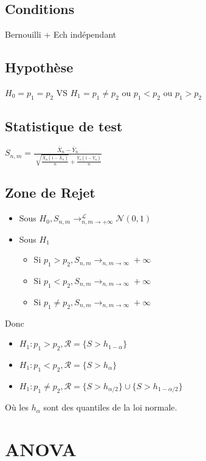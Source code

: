\documentclass[9pt]{article}
\theoremstyle{plain}%
\theoremstyle{definition}
\theoremstyle{remark}
\begin{document}
\begin{multicols}{3}
\subsection*{Conditions}
Bernouilli + Ech indépendant

\subsection*{Hypothèse}
$ H_0 = p_1 = p_2 $ VS $ H_1 = p_1 \neq p_2 $ ou $ p_1 < p_2 $ ou $ p_1 > p_2 $ 

\subsection*{Statistique de test}
$S_{n,m} = \frac{\bar{X}_n - \bar{Y}_n}{\sqrt[]{ \frac{\bar{X}_n (1 - \bar{X}_n)}{n}} + \frac{\bar{Y}_n (1 - \bar{Y}_n)}{n}}$

\subsection*{Zone de Rejet}
\begin{itemize}
    \item Sous $ H_0, S_{n,m} \to ^\mathcal{L}_{n,m \to +\infty } \mathcal{N}(0,1)$
    \item Sous $ H_1 $ \begin{itemize}
        \item Si $ p_1 > p_2, S_{n,m} \to_{n,m \to \infty } +\infty  $ 
        \item Si $ p_1 < p_2, S_{n,m} \to_{n,m \to \infty } +\infty  $ 
        \item Si $ p_1 \neq  p_2, S_{n,m} \to_{n,m \to \infty } +\infty  $ 
    \end{itemize}
\end{itemize}
Donc
\begin{itemize}
    \item $ H_1 : p_1 > p_2, \mathcal{R} = \{S > h_{1 -\alpha }\} $ 
    \item $ H_1 : p_1 < p_2, \mathcal{R} = \{S > h_{\alpha }\} $ 
    \item $ H_1 : p_1 \neq  p_2, \mathcal{R} = \{S > h_{\alpha /2}\} \cup \{S > h_{1 - \alpha /2}\} $ 
\end{itemize}
Où les $ h_{\alpha } $ sont des quantiles de la loi normale.

\section{ANOVA}

\end{multicols}
\end{document}
